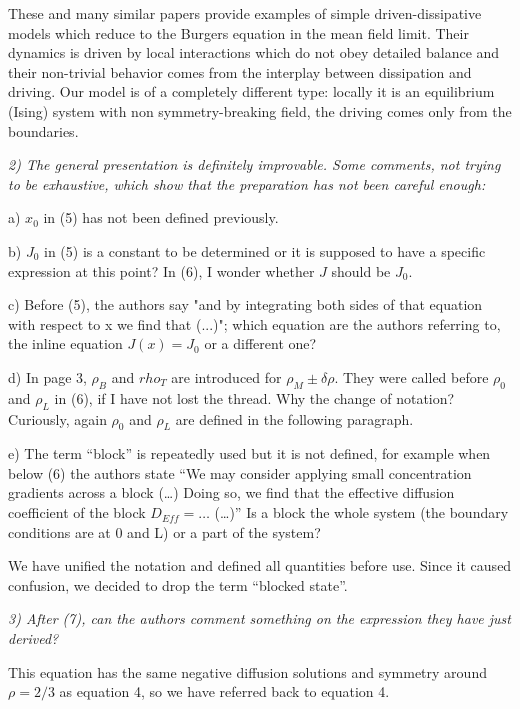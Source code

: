 \documentclass[a4paper,10pt]{article}
\begin{document}
These and many similar papers provide examples of simple
driven-dissipative models which reduce to the Burgers equation in the
mean field limit.  Their dynamics is driven by local interactions
which do not obey detailed balance and their non-trivial behavior
comes from the interplay between dissipation and driving. 
Our model is of a completely different type:  locally it 
is an equilibrium (Ising) system with non symmetry-breaking field, 
the driving comes only from the boundaries. 

  {\it 
   2) The general presentation is definitely improvable. Some comments,
   not trying to be exhaustive, which show that the preparation has not
   been careful enough:
  
   a) $x_0$ in (5) has not been defined previously.
  
   b) $J_0$ in (5) is a constant to be determined or it is supposed to
   have a specific expression at this point? In (6), I wonder whether $J$
   should be $J_0$.
  
   c) Before (5), the authors say "and by integrating both sides of that
   equation with respect to x we find that (...)"; which equation are the
   authors referring to, the inline equation $J(x)=J_0$ or a different
   one?
  
   d) In page 3, $\rho_B$ and $rho_T$ are introduced for
   $\rho_M\pm\delta\rho$. They were called before $\rho_0$ and $\rho_L$
   in (6), if I have not lost the thread. Why the change of notation?
   Curiously, again $\rho_0$ and $\rho_L$ are defined in the following
   paragraph.
  
   e) The term ``block'' is repeatedly used but it is not defined, for
   example when below (6) the authors state ``We may consider applying
   small concentration gradients across a block (\dots) Doing so, we find
   that the effective diffusion coefficient of the block $D_{Eff}=\dots$
   (\dots)'' Is a block the whole system (the boundary conditions are at 0
   and L) or a part of the system?
  }

We have unified the notation and defined all quantities before use.  
Since it caused confusion, we decided to drop the term ``blocked state''.  


  {\it 3) After (7), can the authors comment something on the
    expression they have just derived?  } 

This equation has the same
  negative diffusion solutions and symmetry around $\rho=2/3$ as
  equation 4, so we have referred back to equation 4.
  
\end{document}
